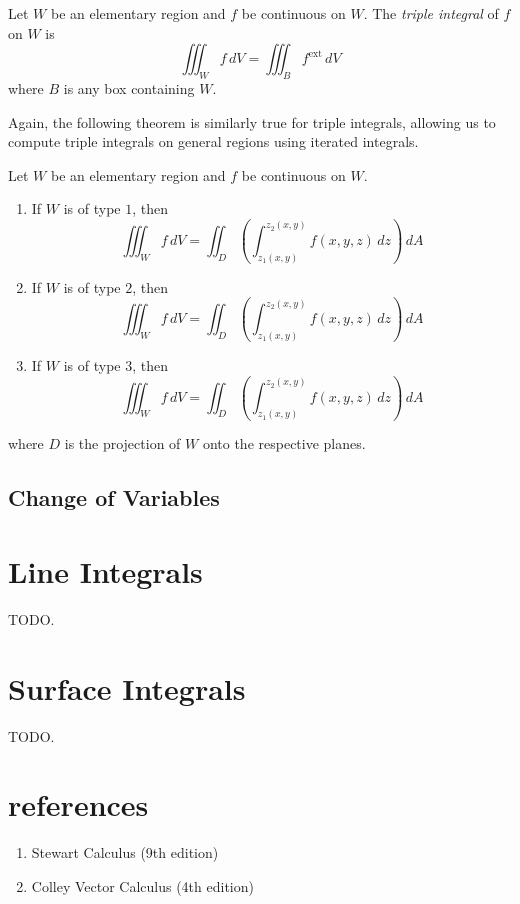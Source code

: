 \documentclass{article}
\begin{document}
\begin{definition}
  Let $W$ be an elementary region and $f$ be continuous on $W$.
  The \emph{triple integral} of $f$ on $W$ is
  \[
    \iiint_W f \, dV = \iiint_B f^{\text{ext}} \, dV
  \]
  where $B$ is any box containing $W$.
\end{definition}
Again, the following theorem is similarly true for triple integrals, allowing us to compute triple integrals on general regions using iterated integrals.
\begin{theorem}
  Let $W$ be an elementary region and $f$ be continuous on $W$.
  \begin{enumerate}
    \item If $W$ is of type $1$, then
          \[
            \iiint_W f \, dV = \iint_D \left( \int_{z_1(x, y)}^{z_2(x, y)} f(x, y, z) \, dz \right) \, dA
          \]
    \item If $W$ is of type $2$, then
          \[
            \iiint_W f \, dV = \iint_D \left( \int_{z_1(x, y)}^{z_2(x, y)} f(x, y, z) \, dz \right) \, dA
          \]
    \item If $W$ is of type $3$, then
          \[
            \iiint_W f \, dV = \iint_D \left( \int_{z_1(x, y)}^{z_2(x, y)} f(x, y, z) \, dz \right) \, dA
          \]
  \end{enumerate}
  where $D$ is the projection of $W$ onto the respective planes.
\end{theorem}

\subsection{Change of Variables}

\section{Line Integrals}

TODO.

\section{Surface Integrals}

TODO.

\section{references}

\begin{enumerate}
  \item Stewart Calculus (9th edition)
  \item Colley Vector Calculus (4th edition)
\end{enumerate}
\end{document}
